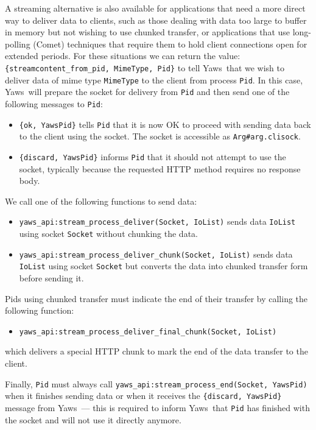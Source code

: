 \documentclass[11pt,oneside,english]{book}
\newcommand{\Yaws}            %
        {{\sc Yaws}}
\begin{document}
A streaming alternative is also available for applications that need a
more direct way to deliver data to clients, such as those dealing with
data too large to buffer in memory but not wishing to use chunked
transfer, or applications that use long-polling (Comet) techniques
that require them to hold client connections open for extended
periods. For these situations we can return the value:
\verb+{streamcontent_from_pid, MimeType, Pid}+ to tell \Yaws\ that we
wish to deliver data of mime type \verb+MimeType+ to the client from
process \verb+Pid+. In this case, \Yaws\ will prepare the socket for
delivery from \verb+Pid+ and then send one of the following messages
to \verb+Pid+:
\begin{itemize}
\item \verb+{ok, YawsPid}+ tells \verb+Pid+ that it is now OK to
  proceed with sending data back to the client using the socket. The
  socket is accessible as \verb+Arg#arg.clisock+.

\item \verb+{discard, YawsPid}+ informs \verb+Pid+ that it should not
  attempt to use the socket, typically because the requested HTTP
  method requires no response body.
\end{itemize}

We call one of the following functions to send data:
\begin{itemize}
\item \verb+yaws_api:stream_process_deliver(Socket, IoList)+ sends
  data \verb+IoList+ using socket \verb+Socket+ without chunking the
  data.

\item \verb+yaws_api:stream_process_deliver_chunk(Socket, IoList)+
  sends data \verb+IoList+ using socket \verb+Socket+ but converts
  the data into chunked transfer form before sending it.
\end{itemize}

Pids using chunked transfer must indicate the end of their transfer by
calling the following function:
\begin{itemize}
\item \verb+yaws_api:stream_process_deliver_final_chunk(Socket, IoList)+
\end{itemize}

which delivers a special HTTP chunk to mark the end of the data
transfer to the client.

Finally, \verb+Pid+ must always call
\verb+yaws_api:stream_process_end(Socket, YawsPid)+ when it finishes
sending data or when it receives the \verb+{discard, YawsPid}+ message
from \Yaws\ --- this is required to inform \Yaws\ that \verb+Pid+ has
finished with the socket and will not use it directly anymore.
\end{document}

